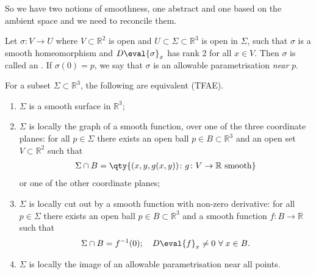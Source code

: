 So we have two notions of smoothness, one abstract and one based on the ambient space and we need to reconcile them.

\begin{definition}
	Let $\sigma \colon V \to U$ where $V \subset \mathbb R^2$ is open and $U \subset \Sigma \subset \mathbb R^3$ is open in $\Sigma$, such that $\sigma$ is a smooth homeomorphism and $D \eval{\sigma}_x$ has rank 2 for all $x \in V$.
	Then $\sigma$ is called an .
	If $\sigma(0) = p$, we say that $\sigma$ is an allowable parametrisation \textit{near} $p$.
\end{definition}

\begin{theorem} \label{thm:1.7}
	For a subset $\Sigma \subset \mathbb R^3$, the following are equivalent (TFAE).
	\begin{enumerate}
		\item $\Sigma$ is a smooth surface in $\mathbb R^3$;
		\item $\Sigma$ is locally the graph of a smooth function, over one of the three coordinate planes: for all $p \in \Sigma$ there exists an open ball $p \in B \subset \mathbb R^3$ and an open set $V \subset \mathbb R^2$ such that
		      \begin{align*}
			      \Sigma \cap B = \qty{(x, y, g(x,y)) \colon g \colon V \to \mathbb R \text{ smooth}}
		      \end{align*}
		      or one of the other coordinate planes;
		\item $\Sigma$ is locally cut out by a smooth function with non-zero derivative: for all $p \in \Sigma$ there exists an open ball $p \in B \subset \mathbb R^3$ and a smooth function $f \colon B \to \mathbb R$ such that
		      \begin{align*}
			      \Sigma \cap B = f^{-1}(0);\quad D \eval{f}_x \neq 0 \ \forall \; x \in B.
		      \end{align*}
		\item $\Sigma$ is locally the image of an allowable parametrisation near all points.
	\end{enumerate}
\end{theorem}

